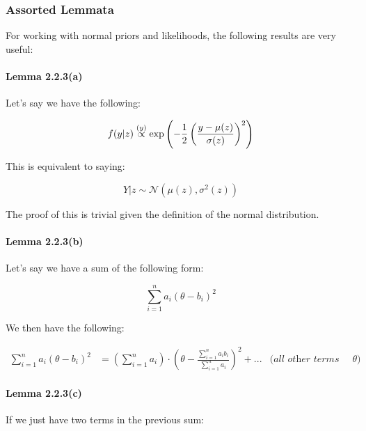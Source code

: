 \documentclass[a4paper]{article}
\begin{document}
            \subsubsection{Assorted Lemmata}
                For working with normal priors and likelihoods, the following
                results are very useful:

                \paragraph{Lemma 2.2.3(a)}
                    Let's say we have the following:

                    \[
                        f(y | z) \stackrel{({y})}{\propto} \exp\left(-\frac{1}{2}\left(
                        \frac{y - \mu(z)}{\sigma(z)}\right)^2\right)
                    \]

                    This is equivalent to saying:

                    \[
                        Y | z \sim \mathcal{N}(\mu(z), \sigma^2(z))
                    \]

                    The proof of this is trivial given the definition of the
                    normal distribution.

                \paragraph{Lemma 2.2.3(b)}
                    Let's say we have a sum of the following form:

                    \[
                        \sum_{i=1}^n a_i (\theta - b_i)^2
                    \]

                    We then have the following:

                    \begin{align*}
                        \sum_{i=1}^n a_i (\theta - b_i)^2 & = \left(\sum_{i=1}^n
                            a_i\right) \cdot \left(\theta -
                            \frac{\sum\limits_{i=1}^na_ib_i}{\sum\limits_{i=1}^n
                            a_i}\right)^2 + ... & \textit{(all other terms are
                            independent of $\theta$)}
                    \end{align*}

                \paragraph{Lemma 2.2.3(c)}
                    If we just have two terms in the previous sum:
\end{document}

